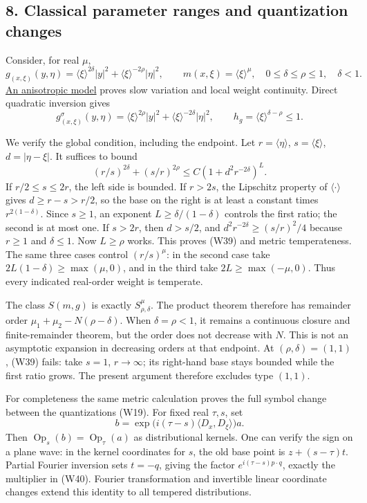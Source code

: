 \documentclass[
  11pt,
]{article}
\begin{document}
\subsection{8. Classical parameter ranges and quantization
changes}\label{classical-parameter-ranges-and-quantization-changes}

Consider, for real \(\mu\), \[
g_{(x,\xi)}(y,\eta)=\langle\xi\rangle^{2\delta}|y|^2+
\langle\xi\rangle^{-2\rho}|\eta|^2,
\qquad m(x,\xi)=\langle\xi\rangle^\mu,
\quad 0\leq\delta\leq\rho\leq1,\quad\delta<1.
\tag{W37}
\] \href{metric-localization.pdf\#section*.29}{An anisotropic
model} proves slow variation and local weight continuity. Direct
quadratic inversion gives \[
g_{(x,\xi)}^\sigma(y,\eta)
=\langle\xi\rangle^{2\rho}|y|^2+
\langle\xi\rangle^{-2\delta}|\eta|^2,
\qquad h_g=\langle\xi\rangle^{\delta-\rho}\leq1.
\tag{W38}
\]

We verify the global condition, including the endpoint. Let
\(r=\langle\eta\rangle\), \(s=\langle\xi\rangle\), \(d=|\eta-\xi|\). It
suffices to bound \[
(r/s)^{2\delta}+(s/r)^{2\rho}
\leq C(1+d^2r^{-2\delta})^L.
\tag{W39}
\] If \(r/2\leq s\leq2r\), the left side is bounded. If \(r>2s\), the
Lipschitz property of \(\langle\cdot\rangle\) gives \(d\geq r-s>r/2\),
so the base on the right is at least a constant times
\(r^{2(1-\delta)}\). Since \(s\geq1\), an exponent
\(L\geq\delta/(1-\delta)\) controls the first ratio; the second is at
most one. If \(s>2r\), then \(d>s/2\), and
\(d^2r^{-2\delta}\geq(s/r)^2/4\) because \(r\geq1\) and \(\delta\leq1\).
Now \(L\geq\rho\) works. This proves (W39) and metric temperateness. The
same three cases control \((r/s)^\mu\): in the second case take
\(2L(1-\delta)\geq\max(\mu,0)\), and in the third take
\(2L\geq\max(-\mu,0)\). Thus every indicated real-order weight is
temperate.

The class \(S(m,g)\) is exactly \(S^\mu_{\rho,\delta}\). The product
theorem therefore has remainder order \(\mu_1+\mu_2-N(\rho-\delta)\).
When \(\delta=\rho<1\), it remains a continuous closure and
finite-remainder theorem, but the order does not decrease with \(N\).
This is not an asymptotic expansion in decreasing orders at that
endpoint. At \((\rho,\delta)=(1,1)\), (W39) fails: take \(s=1\),
\(r\to\infty\); its right-hand base stays bounded while the first ratio
grows. The present argument therefore excludes type \((1,1)\).

For completeness the same metric calculation proves the full symbol
change between the quantizations (W19). For fixed real \(\tau,s\), set
\[
b=\exp\big(i(\tau-s)\langle D_x,D_\xi\rangle\big)a.
\tag{W40}
\] Then \(\operatorname{Op}_s(b)=\operatorname{Op}_\tau(a)\) as
distributional kernels. One can verify the sign on a plane wave: in the
kernel coordinates for \(s\), the old base point is \(z+(s-\tau)t\).
Partial Fourier inversion sets \(t=-q\), giving the factor
\(e^{i(\tau-s)p\cdot q}\), exactly the multiplier in (W40). Fourier
transformation and invertible linear coordinate changes extend this
identity to all tempered distributions.
\end{document}
